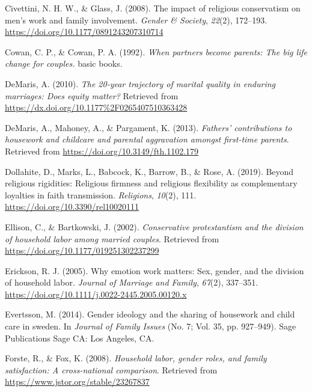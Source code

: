 \documentclass[
  man,floatsintext]{apa6}
\newlength{\cslhangindent}
\newlength{\cslentryspacingunit} %
\newenvironment{CSLReferences}[2] %
 {%
  \setlength{\parindent}{0pt}
  \ifodd #1
  \let\oldpar\par
  \def\par{\hangindent=\cslhangindent\oldpar}
  \fi
  \setlength{\parskip}{#2\cslentryspacingunit}
 }%
 {}
\begin{document}
\begin{CSLReferences}{1}{0}
\leavevmode{}%
Civettini, N. H. W., \& Glass, J. (2008). The impact of religious conservatism on men's work and family involvement. \emph{Gender \& Society}, \emph{22}(2), 172--193. \url{https://doi.org/10.1177/0891243207310714}

\leavevmode{}%
Cowan, C. P., \& Cowan, P. A. (1992). \emph{When partners become parents: The big life change for couples.} basic books.

\leavevmode{}%
DeMaris, A. (2010). \emph{The 20-year trajectory of marital quality in enduring marriages: Does equity matter?} Retrieved from \url{https://dx.doi.org/10.1177\%2F0265407510363428}

\leavevmode{}%
DeMaris, A., Mahoney, A., \& Pargament, K. (2013). \emph{Fathers' contributions to housework and childcare and parental aggravation amongst first-time parents}. Retrieved from \url{https://doi.org/10.3149/fth.1102.179}

\leavevmode{}%
Dollahite, D., Marks, L., Babcock, K., Barrow, B., \& Rose, A. (2019). Beyond religious rigidities: Religious firmness and religious flexibility as complementary loyalties in faith transmission. \emph{Religions}, \emph{10}(2), 111. \url{https://doi.org/10.3390/rel10020111}

\leavevmode{}%
Ellison, C., \& Bartkowski, J. (2002). \emph{Conservative protestantism and the division of household labor among married couples}. Retrieved from \url{https://doi.org/10.1177/019251302237299}

\leavevmode{}%
Erickson, R. J. (2005). Why emotion work matters: Sex, gender, and the division of household labor. \emph{Journal of Marriage and Family}, \emph{67}(2), 337--351. \url{https://doi.org/10.1111/j.0022-2445.2005.00120.x}

\leavevmode{}%
Evertsson, M. (2014). Gender ideology and the sharing of housework and child care in sweden. In \emph{Journal of Family Issues} (No. 7; Vol. 35, pp. 927--949). Sage Publications Sage CA: Los Angeles, CA.

\leavevmode{}%
Forste, R., \& Fox, K. (2008). \emph{Household labor, gender roles, and family satisfaction: A cross-national comparison}. Retrieved from \url{https://www.jstor.org/stable/23267837}


\end{CSLReferences}
\end{document}
